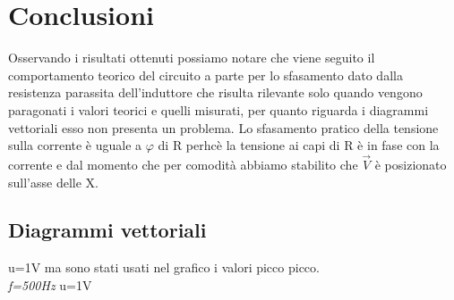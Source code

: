 \documentclass[12pt]{article}
\begin{document}


\section{Conclusioni}
Osservando i risultati ottenuti possiamo notare che viene seguito il comportamento teorico del circuito a parte per lo sfasamento dato
dalla resistenza parassita dell'induttore che risulta rilevante solo quando vengono paragonati i valori teorici e quelli misurati, per quanto riguarda i 
diagrammi vettoriali esso non presenta un problema. 
Lo sfasamento pratico della tensione sulla corrente è uguale a $\varphi$ di R perhcè la tensione ai capi di R è in fase con la corrente
e dal momento che per comodità abbiamo stabilito che $\vec{V}$ è posizionato sull'asse delle X.


\subsection{Diagrammi vettoriali}
u=1V ma sono stati usati nel grafico i valori picco picco.\\
\textit{f=500Hz}   u=1V \\
\end{document}
